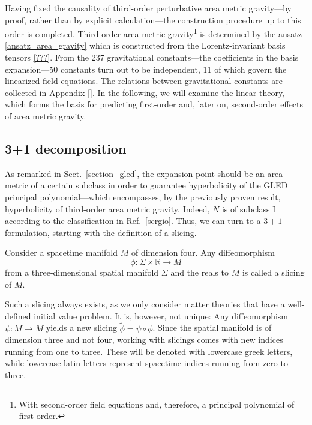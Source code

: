 Having fixed the causality of third-order perturbative area metric gravity---by proof, rather than by explicit calculation---the construction procedure up to this order is completed. Third-order area metric gravity\footnote{With second-order field equations and, therefore, a principal polynomial of first order.} is determined by the ansatz \eqref{ansatz_area_gravity} which is constructed from the Lorentz-invariant basis tensors \eqref{???}. From the 237 gravitational constants---the coefficients in the basis expansion---50 constants turn out to be independent, 11 of which govern the linearized field equations. The relations between gravitational constants are collected in Appendix \ref{}. In the following, we will examine the linear theory, which forms the basis for predicting first-order and, later on, second-order effects of area metric gravity.

\subsection{3+1 decomposition}
\label{sect_three_plus_one}
As remarked in Sect.~\ref{section_gled}, the expansion point should be an area metric of a certain subclass in order to guarantee hyperbolicity of the GLED principal polynomial---which encompasses, by the previously proven result, hyperbolicity of third-order area metric gravity. Indeed, $N$ is of subclass I according to the classification in Ref.~\ref{sergio}. Thus, we can turn to a $3+1$ formulation, starting with the definition of a slicing.
\begin{definition}[slicing]
  Consider a spacetime manifold $M$ of dimension four. Any diffeomorphism
  \begin{equation}
    \phi\colon \Sigma\times\mathbb R \rightarrow M
  \end{equation}
  from a three-dimensional spatial manifold $\Sigma$ and the reals to $M$ is called a slicing of $M$.
\end{definition}
Such a slicing always exists, as we only consider matter theories that have a well-defined initial value problem. It is, however, not unique: Any diffeomorphism $\psi\colon M\rightarrow M$ yields a new slicing $\tilde\phi = \psi\circ\phi$. Since the spatial manifold is of dimension three and not four, working with slicings comes with new indices running from one to three. These will be denoted with lowercase greek letters, while lowercase latin letters represent spacetime indices running from zero to three.


